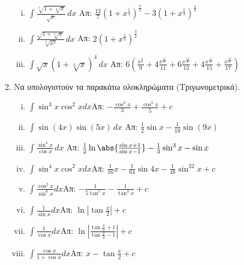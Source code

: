 \begin{enumerate}
    \begin{enumerate}[i)]
      \item $ \int \frac{\sqrt[3]{1+\sqrt[4]{x}}}{\sqrt{x}} \,{dx} $
        \hfill Απ: $ \frac{12}{7} \left(1+x^{\frac{1}{4}}\right)^{\frac{7}{3}} -
        3\left(1+x^{\frac{1}{4}}\right)^{\frac{4}{3}}$
      \item $ \int \frac{\sqrt{1+\sqrt[3]{x}}}{\sqrt[3]{x^{2}}} \,{dx} $
        \hfill Απ: $ 2\left(1+x^{\frac{1}{3}}\right)^{\frac{3}{2}} $
      \item $ \int \sqrt{x} \left(1+\sqrt[3]{x}\right)^{4} \,{dx} $ \hfill Απ: $
        6\left(\frac{x^{\frac{9}{6}}}{9} + 4 \frac{x^{\frac{11}{6}}}{11} + 6
          \frac{x^{\frac{13}{6}}}{13} + 4 \frac{x^{\frac{15}{6}}}{15} +
        \frac{x^{\frac{17}{6}}}{17}\right)$
    \end{enumerate}
  \item Να υπολογιστούν τα παρακάτω ολοκληρώματα (Τριγωνομετρικά).
    \begin{enumerate}[i)]
      \item  $\int\sin^3x\cos^2xdx$\hfill Απ: $-\frac{\cos^3x}{3}+\frac{\cos^5x}{5}+c$
      \item $ \int \sin{(4x)} \sin{(5x)} \,{dx} $ \hfill Απ: $ \frac{1}{2}
        \sin{x} - \frac{1}{18} \sin{(9x)}$
      \item $ \int \frac{\sin^{4}x}{\cos{x}} \,{dx} $ \hfill Απ: $
        \frac{1}{2}\ln{\abs{\frac{\sin{x} +1}{\sin{x} -1}}} -\frac{1}{3} \sin^{3}{x}
        - \sin{x}$
      \item  $\int\sin^4x\cos^2xdx$\hfill Απ: $\frac{1}{16}x-\frac{1}{64}\sin 4x-
        \frac{1}{48}\sin^32x+c$
      \item  $\int\frac{\cos^2x}{\sin^6x}dx$\hfill Απ: $-\frac{1}{5\tan^5x}-
        \frac{1}{\tan^3x}+c$
      \item  $\int\frac{1}{\sin x}dx$\hfill Απ:
        $\ln\left|\tan\frac{x}{2}\right|+c$
      \item  $\int\frac{1}{\cos x}dx$\hfill Απ:
        $\ln\left|\frac{\tan\frac{x}{2}+1}{\tan\frac{x}{2}-1}\right|+c$
      \item  $\int\frac{\cos x}{1+\cos x}dx$\hfill Απ: $x-\tan\frac{x}{2}+c$
    \end{enumerate}
\end{enumerate}



